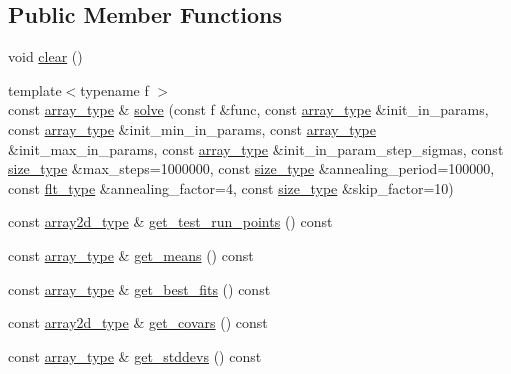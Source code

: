 \subsection*{Public Member Functions}
\begin{DoxyCompactItemize}
\item 
void \hyperlink{classIceBRG_1_1MCMC__solver_a1ee26d93eb8fd10986b93c2e0cd533d8}{clear} ()
\item 
{\footnotesize template$<$typename f $>$ }\\const \hyperlink{classIceBRG_1_1MCMC__solver_ad97acf248381de04fa6fc4bdcd3f9a63}{array\+\_\+type} \& \hyperlink{classIceBRG_1_1MCMC__solver_a57b3d82d6e72f096558db141bd7e7620}{solve} (const f \&func, const \hyperlink{classIceBRG_1_1MCMC__solver_ad97acf248381de04fa6fc4bdcd3f9a63}{array\+\_\+type} \&init\+\_\+in\+\_\+params, const \hyperlink{classIceBRG_1_1MCMC__solver_ad97acf248381de04fa6fc4bdcd3f9a63}{array\+\_\+type} \&init\+\_\+min\+\_\+in\+\_\+params, const \hyperlink{classIceBRG_1_1MCMC__solver_ad97acf248381de04fa6fc4bdcd3f9a63}{array\+\_\+type} \&init\+\_\+max\+\_\+in\+\_\+params, const \hyperlink{classIceBRG_1_1MCMC__solver_ad97acf248381de04fa6fc4bdcd3f9a63}{array\+\_\+type} \&init\+\_\+in\+\_\+param\+\_\+step\+\_\+sigmas, const \hyperlink{lib_2IceBRG__main_2common_8h_a566c61f2ca17211f4ba8557f3f65e8d3}{size\+\_\+type} \&max\+\_\+steps=1000000, const \hyperlink{lib_2IceBRG__main_2common_8h_a566c61f2ca17211f4ba8557f3f65e8d3}{size\+\_\+type} \&annealing\+\_\+period=100000, const \hyperlink{lib_2IceBRG__main_2common_8h_ad0f130a56eeb944d9ef2692ee881ecc4}{flt\+\_\+type} \&annealing\+\_\+factor=4, const \hyperlink{lib_2IceBRG__main_2common_8h_a566c61f2ca17211f4ba8557f3f65e8d3}{size\+\_\+type} \&skip\+\_\+factor=10)
\item 
const \hyperlink{classIceBRG_1_1MCMC__solver_a078c222e71acc977dd50aa67f50a9983}{array2d\+\_\+type} \& \hyperlink{classIceBRG_1_1MCMC__solver_a1e85a59dffdc1589e133154a1c0465f2}{get\+\_\+test\+\_\+run\+\_\+points} () const 
\item 
const \hyperlink{classIceBRG_1_1MCMC__solver_ad97acf248381de04fa6fc4bdcd3f9a63}{array\+\_\+type} \& \hyperlink{classIceBRG_1_1MCMC__solver_a8f5964ff67e7cebf7074debece4ffb3c}{get\+\_\+means} () const 
\item 
const \hyperlink{classIceBRG_1_1MCMC__solver_ad97acf248381de04fa6fc4bdcd3f9a63}{array\+\_\+type} \& \hyperlink{classIceBRG_1_1MCMC__solver_a8fbaaf4322f46115befd0069cc8e52c0}{get\+\_\+best\+\_\+fits} () const 
\item 
const \hyperlink{classIceBRG_1_1MCMC__solver_a078c222e71acc977dd50aa67f50a9983}{array2d\+\_\+type} \& \hyperlink{classIceBRG_1_1MCMC__solver_a1c818ada4e4f307c36ef16d5ff9433a7}{get\+\_\+covars} () const 
\item 
const \hyperlink{classIceBRG_1_1MCMC__solver_ad97acf248381de04fa6fc4bdcd3f9a63}{array\+\_\+type} \& \hyperlink{classIceBRG_1_1MCMC__solver_a1702ce0edb7ed78b7a18513c3333c180}{get\+\_\+stddevs} () const 
\end{DoxyCompactItemize}
